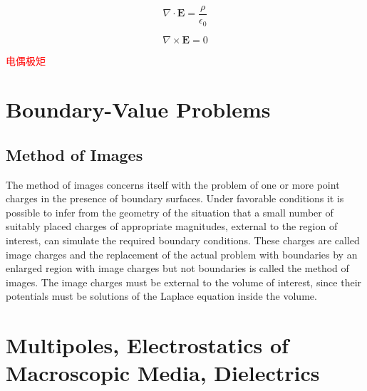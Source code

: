 \documentclass[12pt,a4paper]{article}
\renewcommand{\vec}[1]{\boldsymbol{#1}}
\begin{document}
\begin{equation}
\nabla \cdot \vec{E} = \frac{\rho}{\epsilon_0}
\end{equation}


\begin{equation}
\nabla \times \vec{E} = 0
\end{equation}


\textcolor{red}{电偶极矩}


\section{Boundary-Value Problems}
\subsection{Method of Images}
The method of images concerns itself with the problem of one or more point charges in the presence of boundary surfaces. Under favorable conditions it is possible to infer from the geometry of the situation that a small number of suitably placed charges of appropriate magnitudes, external to the region of interest, can simulate the required boundary conditions. These charges are called image charges and the replacement of the actual problem with boundaries by an enlarged region with image charges but not boundaries is called the method of images. The image charges must be external to the volume of interest, since their potentials must be solutions of the Laplace equation inside the volume.


\section{Multipoles, Electrostatics of Macroscopic Media, Dielectrics}
\end{document}

